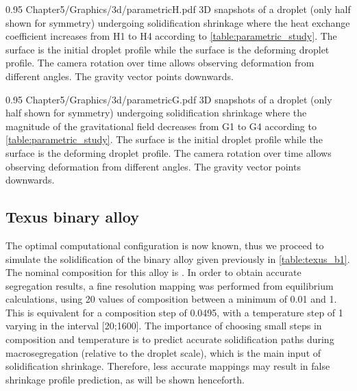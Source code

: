 \begin{figureth}
{0.95}
{Chapter5/Graphics/3d/parametricH.pdf}
{3D snapshots of a droplet (only half shown for symmetry) undergoing solidification shrinkage where the heat exchange coefficient 
increases from H1 to H4 according to \cref{table:parametric_study}. The  surface is the initial droplet profile while the  surface
is the deforming droplet profile. The camera rotation over time allows observing deformation from different angles. The gravity vector points downwards.}
\label{fig:parametricH}
\end{figureth}

\begin{figureth}
{0.95}
{Chapter5/Graphics/3d/parametricG.pdf}
{3D snapshots of a droplet (only half shown for symmetry) undergoing solidification shrinkage where the magnitude of the gravitational field
decreases from G1 to G4 according to \cref{table:parametric_study}. The  surface is the initial droplet profile while the  surface
is the deforming droplet profile. The camera rotation over time allows observing deformation from different angles.
The gravity vector points downwards.}
\label{fig:parametricG}
\end{figureth}


\subsection{Texus binary alloy}

The optimal computational configuration is now known, thus we proceed to simulate the solidification of the binary alloy given previously in \cref{table:texus_b1}.
The nominal composition for this alloy is . In order to obtain accurate segregation results, 
a fine resolution mapping was performed from equilibrium calculations, using 20 values of composition between a minimum of \SI{0.01}{\ucomposition} and \SI{1}{\ucomposition}. 
This is equivalent for a composition step of \SI{0.0495}{\ucomposition}, with a temperature step of \SI{1}{\udegC} 
varying in the interval [\SI{20}{\udegC};\SI{1600}{\udegC}].
The importance of choosing small steps in composition and temperature is to predict 
accurate solidification paths during macrosegregation (relative to the droplet scale), which is the main input of solidification shrinkage. 
Therefore, less accurate mappings may result in false shrinkage profile prediction, as will be shown henceforth.

